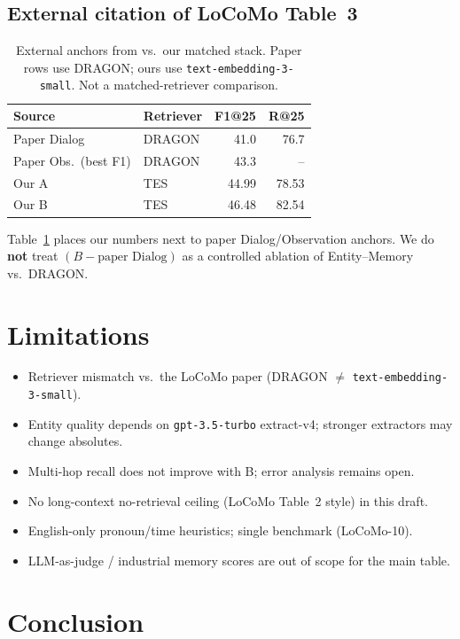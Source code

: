 \documentclass[11pt]{article}
\begin{document}
\subsection{External citation of LoCoMo Table~3}

\begin{table}[t]
\centering
\small
\caption{External anchors from \cite{maharana2024locomo} vs.\ our matched stack.
Paper rows use DRAGON; ours use \texttt{text-embedding-3-small}. Not a matched-retriever comparison.}
\label{tab:paper}
\begin{tabular}{llrr}
\toprule
Source & Retriever & F1@25 & R@25 \\
\midrule
Paper Dialog & DRAGON & 41.0 & 76.7 \\
Paper Obs.\ (best F1) & DRAGON & 43.3 & -- \\
Our A & TES & 44.99 & 78.53 \\
Our B & TES & 46.48 & 82.54 \\
\bottomrule
\end{tabular}
\end{table}

Table~\ref{tab:paper} places our numbers next to paper Dialog/Observation anchors.
We do \textbf{not} treat $(B-\text{paper Dialog})$ as a controlled ablation of Entity--Memory vs.\ DRAGON.

\section{Limitations}
\label{sec:limits}

\begin{itemize}[leftmargin=*,itemsep=2pt]
  \item Retriever mismatch vs.\ the LoCoMo paper (DRAGON $\neq$ \texttt{text-embedding-3-small}).
  \item Entity quality depends on \texttt{gpt-3.5-turbo} extract-v4; stronger extractors may change absolutes.
  \item Multi-hop recall does not improve with B; error analysis remains open.
  \item No long-context no-retrieval ceiling (LoCoMo Table~2 style) in this draft.
  \item English-only pronoun/time heuristics; single benchmark (LoCoMo-10).
  \item LLM-as-judge / industrial memory scores are out of scope for the main table.
\end{itemize}

\section{Conclusion}
\label{sec:conclusion}
\end{document}
